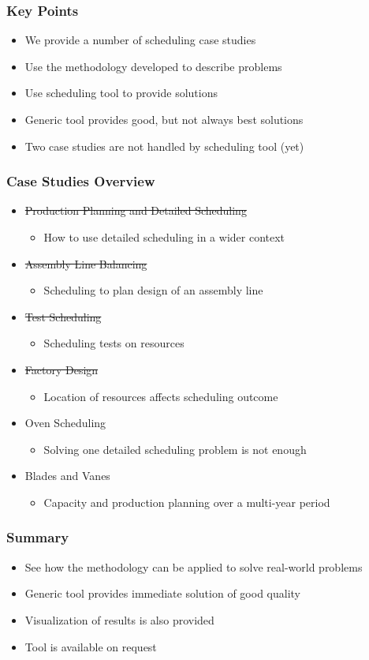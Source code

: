 \begin{frame}
\frametitle{Key Points}
\begin{itemize}
\item We provide a number of scheduling case studies
\item Use the methodology developed to describe problems
\item Use scheduling tool to provide solutions
\item Generic tool provides good, but not always best solutions
\item Two case studies are not handled by scheduling tool (yet)
\end{itemize}
\end{frame}

\begin{frame}
\frametitle{Case Studies Overview}
\begin{itemize}
\item \sout{Production Planning and Detailed Scheduling}
\begin{itemize}
\item How to use detailed scheduling in a wider context
\end{itemize}
\item \sout{Assembly Line Balancing}
\begin{itemize}
\item Scheduling to plan design of an assembly line
\end{itemize}
\item \sout{Test Scheduling}
\begin{itemize}
\item Scheduling tests on resources
\end{itemize}
\item \sout{Factory Design}
\begin{itemize}
\item Location of resources affects scheduling outcome
\end{itemize}
\item Oven Scheduling
\begin{itemize}
\item Solving one detailed scheduling problem is not enough
\end{itemize}
\item Blades and Vanes 
\begin{itemize}
\item Capacity and production planning over a multi-year period
\end{itemize}
\end{itemize}
\end{frame}





\begin{frame}
\frametitle{Summary}
\begin{itemize}
\item See how the methodology can be applied to solve real-world problems
\item Generic tool provides immediate solution of good quality
\item Visualization of results is also provided
\item Tool is available on request
\end{itemize}
\end{frame}

